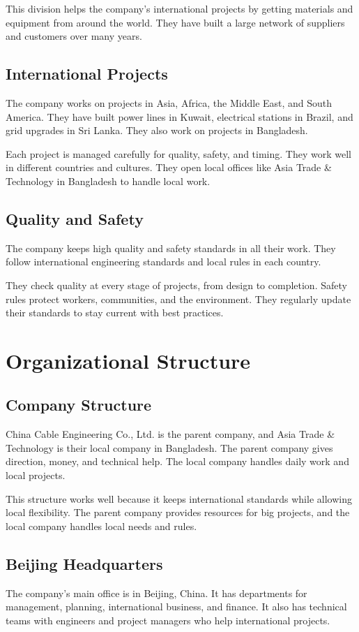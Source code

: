This division helps the company's international projects by getting materials and equipment from around the world. They have built a large network of suppliers and customers over many years.

\subsection{International Projects}
The company works on projects in Asia, Africa, the Middle East, and South America. They have built power lines in Kuwait, electrical stations in Brazil, and grid upgrades in Sri Lanka. They also work on projects in Bangladesh.

Each project is managed carefully for quality, safety, and timing. They work well in different countries and cultures. They open local offices like Asia Trade \& Technology in Bangladesh to handle local work.

\subsection{Quality and Safety}
The company keeps high quality and safety standards in all their work. They follow international engineering standards and local rules in each country.

They check quality at every stage of projects, from design to completion. Safety rules protect workers, communities, and the environment. They regularly update their standards to stay current with best practices.

\section{Organizational Structure}

\subsection{Company Structure}
China Cable Engineering Co., Ltd. is the parent company, and Asia Trade \& Technology is their local company in Bangladesh. The parent company gives direction, money, and technical help. The local company handles daily work and local projects.

This structure works well because it keeps international standards while allowing local flexibility. The parent company provides resources for big projects, and the local company handles local needs and rules.

\subsection{Beijing Headquarters}
The company's main office is in Beijing, China. It has departments for management, planning, international business, and finance. It also has technical teams with engineers and project managers who help international projects.


